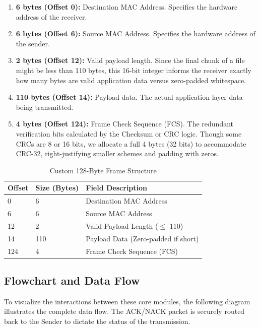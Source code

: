 \documentclass[12pt, a4paper]{article}
\begin{document}
\begin{enumerate}
    \item \textbf{6 bytes (Offset 0):} Destination MAC Address. Specifies the hardware address of the receiver.
    \item \textbf{6 bytes (Offset 6):} Source MAC Address. Specifies the hardware address of the sender.
    \item \textbf{2 bytes (Offset 12):} Valid payload length. Since the final chunk of a file might be less than 110 bytes, this 16-bit integer informs the receiver exactly how many bytes are valid application data versus zero-padded whitespace.
    \item \textbf{110 bytes (Offset 14):} Payload data. The actual application-layer data being transmitted.
    \item \textbf{4 bytes (Offset 124):} Frame Check Sequence (FCS). The redundant verification bits calculated by the Checksum or CRC logic. Though some CRCs are 8 or 16 bits, we allocate a full 4 bytes (32 bits) to accommodate CRC-32, right-justifying smaller schemes and padding with zeros.
\end{enumerate}

\vspace{10pt}
\begin{table}[H]
\centering
\begin{tabular}{|l|l|l|}
\hline
\textbf{Offset} & \textbf{Size (Bytes)} & \textbf{Field Description} \\ \hline
0 & 6 & Destination MAC Address \\ \hline
6 & 6 & Source MAC Address \\ \hline
12 & 2 & Valid Payload Length ($\le$ 110) \\ \hline
14 & 110 & Payload Data (Zero-padded if short) \\ \hline
124 & 4 & Frame Check Sequence (FCS) \\ \hline
\end{tabular}
\caption{Custom 128-Byte Frame Structure}
\end{table}

\subsection{Flowchart and Data Flow}
To visualize the interactions between these core modules, the following diagram illustrates the complete data flow. The ACK/NACK packet is securely routed back to the Sender to dictate the status of the transmission.
\end{document}
